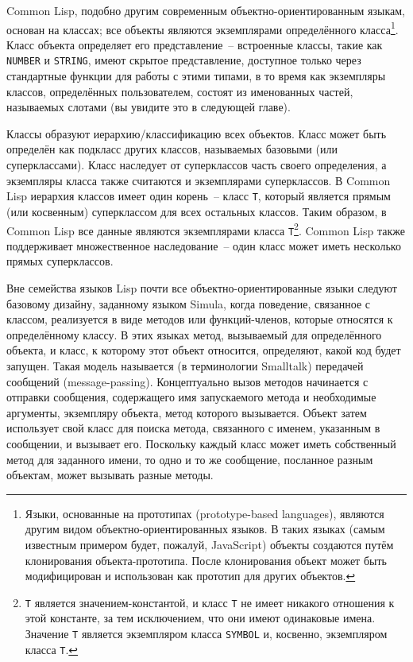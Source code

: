 Common Lisp, подобно другим современным объектно-ориентированным языкам, основан на
классах; все объекты являются экземплярами определённого класса\footnote{Языки, основанные
  на прототипах (prototype-based languages), являются другим видом объектно-ориентированных
  языков. В таких языках (самым известным примером будет, пожалуй, JavaScript) объекты
  создаются путём клонирования объекта-прототипа. После клонирования объект может быть
  модифицирован и использован как прототип для других объектов.}.  Класс объекта
определяет его представление~-- встроенные классы, такие как \lstinline{NUMBER} и \lstinline{STRING},
имеют скрытое представление, доступное только через стандартные функции для работы с этими
типами, в то время как экземпляры классов, определённых пользователем, состоят из
именованных частей, называемых слотами (вы увидите это в следующей главе).

Классы образуют иерархию/классификацию всех объектов.  Класс может быть определён как
подкласс других классов, называемых базовыми (или суперклассами).  Класс наследует от
суперклассов часть своего определения, а экземпляры класса также считаются и экземплярами
суперклассов.  В Common Lisp иерархия классов имеет один корень~-- класс \lstinline{T}, который
является прямым (или косвенным) суперклассом для всех остальных классов.  Таким образом, в
Common Lisp все данные являются экземплярами класса \lstinline{T}\footnote{\lstinline{T} является
  значением-константой, и класс \lstinline{T} не имеет никакого отношения к этой константе, за
  тем исключением, что они имеют одинаковые имена.  Значение \lstinline{T} является экземпляром
  класса \lstinline{SYMBOL} и, косвенно, экземпляром класса \lstinline{T}.}.  Common Lisp также
поддерживает множественное наследование~-- один класс может иметь несколько прямых
суперклассов.

Вне семейства языков Lisp почти все объектно-ориентированные языки следуют базовому
дизайну, заданному языком Simula, когда поведение, связанное с классом, реализуется в виде
методов или функций-членов, которые относятся к определённому классу.  В этих языках
метод, вызываемый для определённого объекта, и класс, к которому этот объект относится,
определяют, какой код будет запущен.  Такая модель называется (в терминологии Smalltalk)
передачей сообщений (message-passing).  Концептуально вызов методов начинается с отправки
сообщения, содержащего имя запускаемого метода и необходимые аргументы, экземпляру
объекта, метод которого вызывается.  Объект затем использует свой класс для поиска метода,
связанного с именем, указанным в сообщении, и вызывает его.  Поскольку каждый класс может
иметь собственный метод для заданного имени, то одно и то же сообщение, посланное разным
объектам, может вызывать разные методы.

